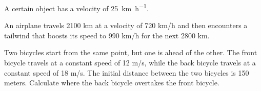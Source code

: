 \documentclass[10pt]{exam}
\begin{document}
\begin{questions}
  \question
    A certain object has a velocity of \SI{25}{\kilo\meter\per\hour}.



\pagebreak

  \question
    An airplane travels 2100 km at a velocity of 720 km/h and then encounters a tailwind that boosts its speed to 990 km/h for the next 2800 km.  


  \vs[2]


  \question 
    Two bicycles start from the same point, but one is ahead of the other. The front bicycle travels at a constant speed of 12 m/s, while the back bicycle travels at a constant speed of 18 m/s. The initial distance between the two bicycles is 150 meters.  Calculate where the back bicycle overtakes the front bicycle.

    \vs

\end{questions}
\end{document}
